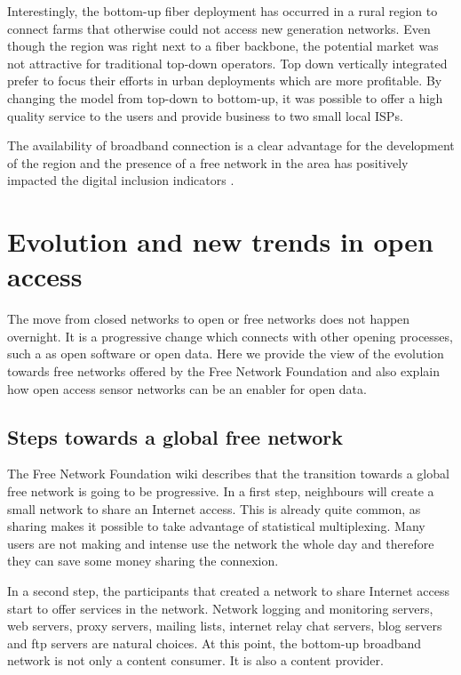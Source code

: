 \documentclass[journal]{IEEEtran}
\begin{document}
Interestingly,  the bottom-up fiber deployment has occurred in a rural region to connect farms that otherwise could not access new generation networks.
Even though the region was right next to a fiber backbone, the potential market was not attractive for traditional top-down operators.
Top down vertically integrated prefer to focus their efforts in urban deployments which are more profitable.
By changing the model from top-down to bottom-up, it was possible to offer a high quality service to the users and provide business to two small local ISPs.

The availability of broadband connection is a clear advantage for the development of the region and the presence of a free network in the area has positively impacted the digital inclusion indicators \cite{oliver2010wca}.

\section{Evolution and new trends in open access}

The move from closed networks to open or free networks does not happen overnight.
It is a progressive change which connects with other opening processes, such a as open software or open data.
Here we provide the view of the evolution towards free networks offered by the Free Network Foundation and also explain how open access sensor networks can be an enabler for open data.


\subsection{Steps towards a global free network}
The Free Network Foundation wiki describes that the transition towards a global free network is going to be progressive.
In a first step, neighbours will create a small network to share an Internet access.
This is already quite common, as sharing makes it possible to take advantage of statistical multiplexing.
Many users are not making and intense use the network the whole day and therefore they can save some money sharing the connexion.

In a second step, the participants that created a network to share Internet access start to offer services in the network.
Network logging and monitoring servers, web servers, proxy servers, mailing lists, internet relay chat servers, blog servers and ftp servers are natural choices.
At this point, the bottom-up broadband network is not only a content consumer.
It is also a content provider.
\end{document}
